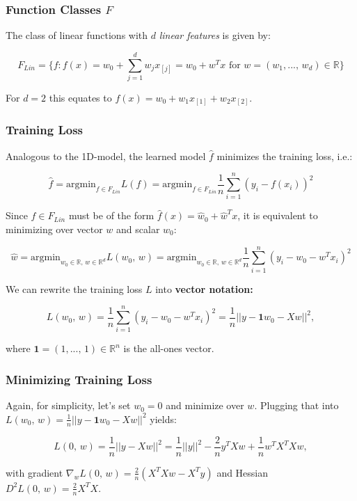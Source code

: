 \documentclass[a4paper]{extarticle}
\begin{document}
\subsubsection{Function Classes \(F\)}

The class of linear functions with \(d\) \textit{linear features} is given by:

\[
	F_{Lin} = \{f : f(x) = w_0 + \sum_{j = 1}^d w_jx_{[j]} = w_0 + w^Tx \text{ for } w = (w_1,..., \, w_d) \in \mathbb{R}\}	
\]

For \(d = 2\) this equates to \(f(x) = w_0 + w_1x_{[1]} + w_2x_{[2]}\).

\subsubsection{Training Loss}

Analogous to the 1D-model, the learned model \(\hat{f}\) minimizes the training loss, i.e.:

\[
	\hat{f} = \text{argmin}_{f \in F_{Lin}} L(f) = \text{argmin}_{f \in F_{Lin}} \frac{1}{n} \sum_{i = 1}^n (y_i - f(x_i))^2	
\]

Since \(\hat{f} \in F_{Lin}\) must be of the form \(\hat{f}(x) = \hat{w}_0 + \hat{w}^Tx\), it is equivalent to minimizing over vector \(w\) and scalar \(w_0\):

\[
	\hat{w} = \text{argmin}_{w_0 \in \mathbb{R}, \, w \in \mathbb{R}^d} L(w_0, \, w) = \text{argmin}_{w_0 \in \mathbb{R}, \, w \in \mathbb{R}^d} \frac{1}{n} \sum_{i = 1}^n (y_i - w_0 - w^Tx_i)^2
\]

We can rewrite the training loss \(L\) into \textbf{vector notation:}

\[
	L(w_0, \, w) = \frac{1}{n} \sum_{i = 1}^n (y_i - w_0 - w^Tx_i)^2 = \frac{1}{n}||y - \textbf{1}w_0 - Xw||^2,
\]

where \(\textbf{1} = (1,..., \, 1) \in \mathbb{R}^n\) is the all-ones vector.

\subsubsection{Minimizing Training Loss}

Again, for simplicity, let's set \(w_0 = 0\) and minimize over \(w\). Plugging that into \(L(w_0, \, w) = \frac{1}{n}||y - \textbf{1}w_0 - Xw||^2\) yields:

\[
	L(0, \, w) = \frac{1}{n}||y - Xw||^2 = \frac{1}{n}||y||^2 - \frac{2}{n}y^TXw + \frac{1}{n}w^TX^TXw,
\]

with gradient \(\nabla_w L(0, \, w) = \frac{2}{n}(X^TXw - X^Ty)\) and Hessian \(D^2L(0, \, w) = \frac{2}{n}X^TX\).
\end{document}
